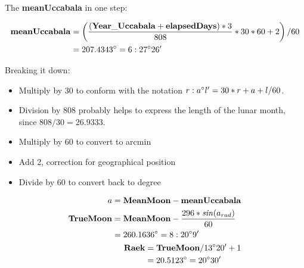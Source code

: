 \documentclass[11pt,oneside]{memoir-article}
\begin{document}
The \textbf{meanUccabala} in one step:

\begin{align}
\begin{split}
  \mathbf{meanUccabala} &= \left( \frac{(\mathbf{Year\_Uccabala} + \mathbf{elapsedDays}) * 3}{808} * 30 * 60 + 2 \right) / 60\\
                        &= 207.4343^\circ = 6:27^\circ 26^\prime
\end{split}
\end{align}

Breaking it down:

\begin{itemize}
\item Multiply by 30 to conform with the notation $r:a^\circ l^\prime = 30*r + a + l/60$.
\item Division by 808 probably helps to express the length of the lunar month, since $808 / 30 = 26.9333$.
\item Multiply by 60 to convert to arcmin
\item Add 2, correction for geographical position
\item Divide by 60 to convert back to degree
\end{itemize}


\begin{align}
\begin{split}
                 a &= \mathbf{MeanMoon} - \mathbf{meanUccabala}\\
 \mathbf{TrueMoon} &= \mathbf{MeanMoon} - \frac{296 * \mathit{sin}(a_{rad})}{60}\\
                   &= 260.1636^\circ = 8:20^\circ 9^\prime
\end{split}\\
\begin{split}
     \mathbf{Raek} &= \mathbf{TrueMoon} / 13^\circ 20^\prime + 1\\
                   &= 20.5123^\circ = 20^\circ 30^\prime
\end{split}
\end{align}
\end{document}
